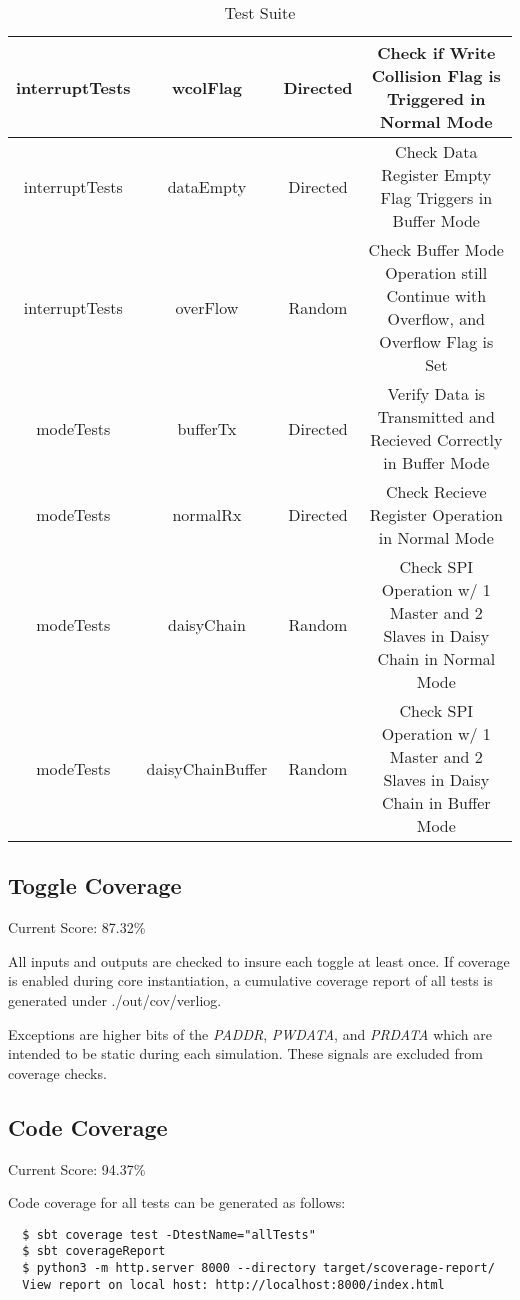 \begin{table}[h]
{\begin{tabular}{|c|c|c|c|}
      interruptTests & wcolFlag & Directed & Check if Write Collision Flag is Triggered in Normal Mode \\ \hline
      interruptTests & dataEmpty & Directed & Check Data Register Empty Flag Triggers in Buffer Mode \\ \hline
      interruptTests & overFlow & Random & Check Buffer Mode Operation still Continue with Overflow, and Overflow Flag is Set \\ \hline
      modeTests & bufferTx & Directed & Verify Data is Transmitted and Recieved Correctly in Buffer Mode \\ \hline
      modeTests & normalRx & Directed & Check Recieve Register Operation in Normal Mode \\ \hline
      modeTests & daisyChain & Random & Check SPI Operation w/ 1 Master and 2 Slaves in Daisy Chain in Normal Mode \\ \hline
      modeTests & daisyChainBuffer & Random & Check SPI Operation w/ 1 Master and 2 Slaves in Daisy Chain in Buffer Mode \\ \hline
    \end{tabular}
  }
  \caption{Test Suite}
\end{table}

\subsection{Toggle Coverage}
Current Score: 87.32\%

All inputs and outputs are checked to insure each toggle at least once. If coverage is enabled
during core instantiation, a cumulative coverage report of all tests is generated under ./out/cov/verliog.

Exceptions are higher bits of the \emph{PADDR}, \emph{PWDATA}, and \emph{PRDATA}
which are intended to be static during each simulation. These signals are
excluded from coverage checks.

\subsection{Code Coverage}
Current Score: 94.37\%

Code coverage for all tests can be generated as follows:
\begin{verbatim}
  $ sbt coverage test -DtestName="allTests"
  $ sbt coverageReport
  $ python3 -m http.server 8000 --directory target/scoverage-report/
  View report on local host: http://localhost:8000/index.html
\end{verbatim}


